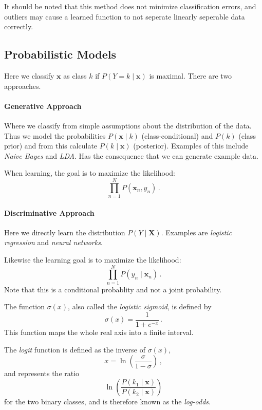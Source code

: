 It should be noted that this method does not minimize classification errors, and outliers may cause a learned function to not seperate linearly seperable data correctly.

\subsection{Probabilistic Models}

Here we classify $\mathbf{x}$ as class $k$ if $P(Y = k \mid \mathbf{x})$ is maximal.
There are two approaches.

\paragraph{Generative Approach} Where we classify from simple assumptions about the distribution of the data.
    Thus we model the probabilities $P(\mathbf{x} \mid k)$ (class-conditional) and $P(k)$ (class prior) and from this calculate $P(k \mid \mathbf{x})$ (posterior).
    Examples of this include \emph{Naive Bayes} and \emph{LDA}.
    Has the consequence that we can generate example data.

    When learning, the goal is to maximize the likelihood:
    \[
        \prod_{n=1}^N P(\mathbf{x}_n, y_n)\,.
    \]

\paragraph{Discriminative Approach} Here we directly learn the distribution $P(Y \mid \mathbf{X})$.
    Examples are \emph{logistic regression} and \emph{neural networks}.

    Likewise the learning goal is to maximize the likelihood:
    \[
        \prod_{n=1}^N P(y_n \mid \mathbf{x}_n)\,.
    \]
    Note that this is a conditional probablity and not a joint probability.

\begin{mdframed}[frametitle={Sigmoid, Logit, and log-odds}]
    The function $\sigma(x)$, also called the \emph{logistic sigmoid}, is defined by
    \[
        \sigma(x) = \frac 1 {1 + e^{-x}}\,.
    \]
    This function maps the whole real axis into a finite interval.

    The \emph{logit} function is defined as the inverse of $\sigma(x)$,
    \[
        x = \ln \left( \frac \sigma {1 - \sigma} \right)\,,
    \]
    and represents the ratio
    \[
        \ln \left( \frac {P(k_1 \mid \mathbf{x})} {P(k_2 \mid \mathbf{x})} \right)
    \]
    for the two binary classes, and is therefore known as the \emph{log-odds}.
\end{mdframed}

